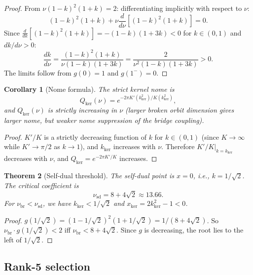 \documentclass[12pt]{article}
\theoremstyle{plain}
\newtheorem{theorem}{Theorem}[section]
\newtheorem{corollary}[theorem]{Corollary}
\theoremstyle{definition}
\numberwithin{equation}{section}
\newcommand{\br}{\mathrm{br}}
\newcommand{\kker}{\mathrm{ker}}
\begin{document}
\begin{proof}
From $\nu(1-k)^2(1+k)=2$: differentiating implicitly with respect to $\nu$:
\begin{equation}
(1-k)^2(1+k)+\nu\frac{d}{d\nu}[(1-k)^2(1+k)]=0.
\end{equation}
Since $\frac{d}{dk}[(1-k)^2(1+k)]=-(1-k)(1+3k)<0$ for $k\in(0,1)$ and $dk/d\nu>0$:
\begin{equation}
\frac{dk}{d\nu} = \frac{(1-k)^2(1+k)}{\nu(1-k)(1+3k)} = \frac{2}{\nu^2(1-k)(1+3k)} > 0.
\end{equation}
The limits follow from $g(0)=1$ and $g(1^-)=0$.
\end{proof}

\begin{corollary}[Nome formula]\label{cor:nome}
The strict kernel nome is
\begin{equation}
Q_{\kker}(\nu) = e^{-2\pi K'(k_{\kker}^2)/K(k_{\kker}^2)},
\end{equation}
and $Q_{\kker}(\nu)$ is strictly increasing in $\nu$ (larger broken orbit dimension gives larger nome, but weaker nome suppression of the bridge coupling).
\end{corollary}

\begin{proof}
$K'/K$ is a strictly decreasing function of $k$ for $k\in(0,1)$ (since $K\to\infty$ while $K'\to\pi/2$ as $k\to 1$), and $k_{\kker}$ increases with $\nu$.  Therefore $K'/K|_{k=k_{\kker}}$ decreases with $\nu$, and $Q_{\kker}=e^{-2\pi K'/K}$ increases.
\end{proof}

\begin{theorem}[Self-dual threshold]\label{thm:selfdual}
The self-dual point is $x=0$, i.e., $k=1/\sqrt{2}$.  The critical coefficient is
\begin{equation}
\nu_{\mathrm{sd}} = 8+4\sqrt{2} \approx 13.66.
\end{equation}
For $\nu_{\br}<\nu_{\mathrm{sd}}$, we have $k_{\kker}<1/\sqrt{2}$ and $x_{\ker}=2k_{\kker}^2-1<0$.
\end{theorem}

\begin{proof}
$g(1/\sqrt{2})=(1-1/\sqrt{2})^2(1+1/\sqrt{2})=1/(8+4\sqrt{2})$.  So $\nu_{\br}\cdot g(1/\sqrt{2})<2$ iff $\nu_{\br}<8+4\sqrt{2}$.  Since $g$ is decreasing, the root lies to the left of $1/\sqrt{2}$.
\end{proof}

\subsection{Rank-5 selection}
\end{document}

